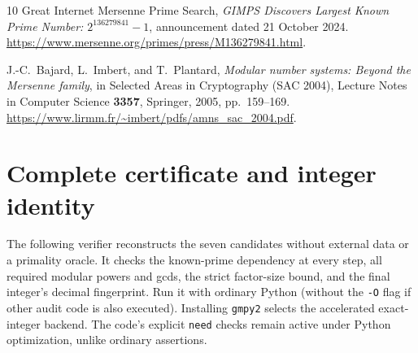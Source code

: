 \documentclass[11pt,a4paper]{article}
\theoremstyle{definition}
\begin{document}
\begin{thebibliography}{10}
Great Internet Mersenne Prime Search,
\emph{GIMPS Discovers Largest Known Prime Number: $2^{136279841}-1$},
announcement dated 21 October 2024.
\url{https://www.mersenne.org/primes/press/M136279841.html}.

J.-C.~Bajard, L.~Imbert, and T.~Plantard,
\emph{Modular number systems: Beyond the Mersenne family},
in Selected Areas in Cryptography (SAC 2004), Lecture Notes in Computer
Science \textbf{3357}, Springer, 2005, pp.~159--169.
\url{https://www.lirmm.fr/~imbert/pdfs/amns_sac_2004.pdf}.

\end{thebibliography}

\clearpage
\appendix
\section{Complete certificate and integer identity}
\label{app:certificate}

The following verifier reconstructs the seven candidates without external
data or a primality oracle. It checks the known-prime dependency at every
step, all required modular powers and gcds, the strict factor-size bound,
and the final integer's decimal fingerprint. Run it with ordinary Python
(without the \texttt{-O} flag if other audit code is also executed).
Installing \texttt{gmpy2} selects the accelerated exact-integer backend.
The code's explicit \texttt{need} checks remain active under Python
optimization, unlike ordinary assertions.
\end{document}
